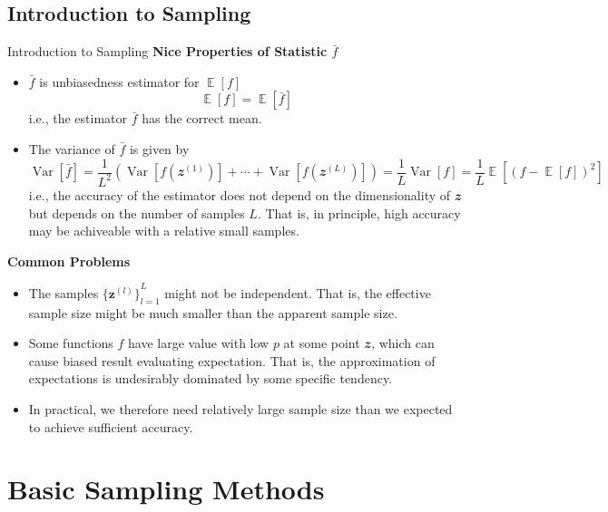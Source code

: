 \documentclass{bredelebeamer}
\DeclareMathOperator*{\E}{\mathbb{E}}
\DeclareMathOperator*{\var}{Var}
\begin{document}
\subsection{Introduction to Sampling}
\begin{frame}{Introduction to Sampling}
  \textbf{Nice Properties of Statistic $\bar{f}$}
  \begin{itemize}
    \item $\bar{f}$ is unbiasedness estimator for $\E[f]$
    \begin{equation*}
      \E[f] = \E[\bar{f}]
    \end{equation*}
    i.e., the estimator $\bar{f}$ has the correct mean.

    \item
    The variance of $\bar{f}$ is given by
    \begin{equation*}
      \var[\bar{f}]
      = \frac{1}{L^2} (\var[f(\mathbfit{z}^{(1)})] + \cdots + \var[f(\mathbfit{z}^{(L)})])
      = \frac{1}{L} \var[f]
      = \frac{1}{L}\E[{(f - \E[f])}^2]
    \end{equation*}
    i.e., the accuracy of the estimator does not depend on the dimensionality
    of $\mathbfit{z}$ but depends on the number of samples $L$. That is, in
    principle, high accuracy may be achiveable with a relative small samples.
  \end{itemize}

  \textbf{Common Problems}
  \begin{itemize}
    \item The samples ${\{\mathbf{z}^{(l)}\}}_{l=1}^{L}$ might not be
    independent. That is, the effective sample size might be much smaller
    than the apparent sample size.
    \item Some functions $f$ have large value with low $p$ at some point
    $\mathbfit{z}$, which can cause biased result evaluating expectation.
    That is, the approximation of expectations is undesirably dominated
    by some specific tendency.
    \item In practical, we therefore need relatively large sample size
    than we expected to achieve sufficient accuracy.
  \end{itemize}
\end{frame}

\section{Basic Sampling Methods}
\end{document}
